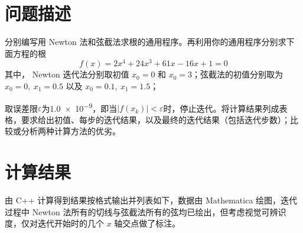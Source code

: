 \documentclass[11pt]{article}
\begin{document}
\maketitle %

\thispagestyle{empty} %

\newpage

\section{问题描述}
分别编写用 Newton 法和弦截法求根的通用程序。再利用你的通用程序分别求下面方程的根
$$
    f(x) = 2x^4 + 24x^3 + 61x - 16x + 1 = 0
$$
其中， Newton 迭代法分别取初值 $x_0 = 0$ 和 $x_0 = 3$；弦截法的初值分别取为 $x_0 = 0,\ x_1 = 0.5$ 以及 $x_0 = 0.1,\ x_1 = 1.5$；

取误差限$\varepsilon$为\num{1.0e-9}，即当$|f(x_k)| < \varepsilon$时，停止迭代。将计算结果列成表格，要求给出初值、每步的迭代结果，以及最终的迭代结果（包括迭代步数）；比较或分析两种计算方法的优劣。

\section{计算结果}
由 C++ 计算得到结果按格式输出并列表如下，数据由 Mathematica 绘图，迭代过程中 Newton 法所有的切线与弦截法所有的弦均已绘出，但考虑视觉可辨识度，仅对迭代开始时的几个 $x$ 轴交点做了标注。
\end{document}
